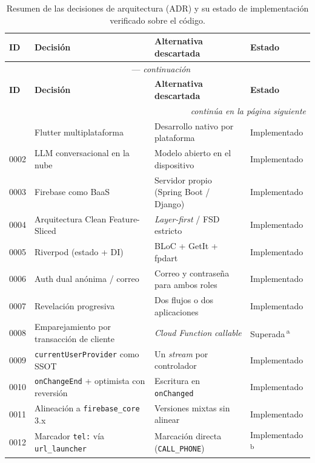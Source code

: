 \begin{longtable}{@{}l >{\RaggedRight\arraybackslash}p{} >{\RaggedRight\arraybackslash}p{} l@{}}
\caption{Resumen de las decisiones de arquitectura (ADR) y su estado de implementación verificado sobre el código.}
\label{tab:adr} \\
\toprule
\textbf{ID} & \textbf{Decisión} & \textbf{Alternativa descartada} & \textbf{Estado} \\
\midrule
\endfirsthead
\multicolumn{4}{c}{\tablename\ \thetable{} --- \textit{continuación}} \\
\toprule
\textbf{ID} & \textbf{Decisión} & \textbf{Alternativa descartada} & \textbf{Estado} \\
\midrule
\endhead
\midrule \multicolumn{4}{r}{\textit{continúa en la página siguiente}} \\
\endfoot
\bottomrule
\endlastfoot
0001 & Flutter multiplataforma            & Desarrollo nativo por plataforma        & Implementado \\
0002 & LLM conversacional en la nube      & Modelo abierto en el dispositivo        & Implementado \\
0003 & Firebase como BaaS                 & Servidor propio (Spring Boot / Django)  & Implementado \\
0004 & Arquitectura Clean Feature-Sliced  & \emph{Layer-first} / FSD estricto       & Implementado \\
0005 & Riverpod (estado + DI)             & BLoC + GetIt + fpdart                   & Implementado \\
0006 & Auth dual anónima / correo         & Correo y contraseña para ambos roles    & Implementado \\
0007 & Revelación progresiva              & Dos flujos o dos aplicaciones           & Implementado \\
0008 & Emparejamiento por transacción de cliente & \emph{Cloud Function} \emph{callable} & Superada\,\textsuperscript{a} \\
0009 & \texttt{currentUserProvider} como SSOT & Un \emph{stream} por controlador    & Implementado \\
0010 & \texttt{onChangeEnd} + optimista con reversión & Escritura en \texttt{onChanged} & Implementado \\
0011 & Alineación a \texttt{firebase\_core} 3.x & Versiones mixtas sin alinear      & Implementado \\
0012 & Marcador \texttt{tel:} vía \texttt{url\_launcher} & Marcación directa (\texttt{CALL\_PHONE}) & Implementado\,\textsuperscript{b} \\

\end{longtable}
